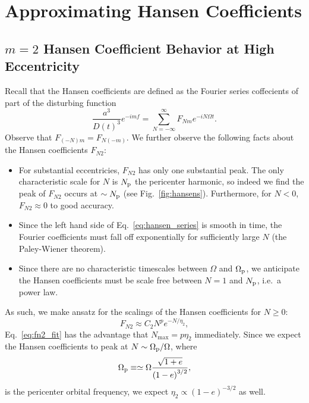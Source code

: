 \documentclass[
        fleqn,
        usenatbib,
        referee,
    ]{mnras}
\newcommand*{\p}[1]{\left(#1\right)}
\begin{document}
\section{Approximating Hansen Coefficients}\label{s:hansens}

\subsection{$m=2$ Hansen Coefficient Behavior at High Eccentricity}

Recall that the Hansen coefficients are defined as the Fourier series coffecients
of part of the disturbing function
\begin{equation}
    \frac{a^3}{D(t)^3} e^{-imf} = \sum\limits_{N = -\infty}^\infty
        F_{Nm} e^{-iN\Omega t}.\label{eq:hansen_series}
\end{equation}
Observe that $F_{(-N)m} = F_{N(-m)}$. We further observe the following facts about
the Hansen coefficients $F_{N2}$:
\begin{itemize}
    \item For substantial eccentricies, $F_{N2}$ has only one substantial peak.
        The only characteristic scale for $N$ is $N_{\rm p}$ the pericenter
        harmonic, so indeed we find the peak of $F_{N2}$ occurs at $\sim N_{\rm
        p}$ (see Fig.~\ref{fig:hansens}). Furthermore, for $N < 0$, $F_{N2}
        \approx 0$ to good accuracy.

    \item Since the left hand side of Eq.~\eqref{eq:hansen_series} is smooth in
        time, the Fourier coefficients must fall off exponentially for
        sufficiently large $N$ (the Paley-Wiener theorem).

    \item Since there are no characteristic timescales between $\Omega$ and
        $\Omega_{\rm p}$, we anticipate the Hansen coefficients must be scale
        free between $N = 1$ and $N_{\rm p}$, i.e.\ a power law.
\end{itemize}
As such, we make ansatz for the scalings of the Hansen coefficients for $N \geq
0$:
\begin{equation}
    F_{N2} \approx C_2 N^{p}e^{-N/\eta_2},\label{eq:fn2_fit}
\end{equation}
Eq.~\eqref{eq:fn2_fit} has the advantage that $N_{\max} = p\eta_2$
immediately. Since we expect the Hansen coefficients to peak at $N \sim
\Omega_{\rm p} / \Omega$, where
\begin{equation}
    \Omega_{\rm p} \equiv \simeq \Omega \frac{\sqrt{1 + e}}{\p{1 - e}^{3/2}},
\end{equation}
is the pericenter orbital frequency, we expect $\eta_2 \propto \p{1 - e}^{-3/2}$
as well.
\end{document}
